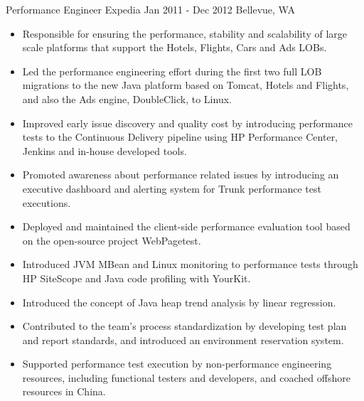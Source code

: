 \documentclass[]{mspier-cv}
\begin{document}
\experienceitem
  {Performance Engineer}
  {Expedia}
  {Jan 2011 - Dec 2012}
  {Bellevue, WA}
  {
  \begin{itemize}
    \item Responsible for ensuring the performance, stability and scalability of large scale platforms that support the Hotels, Flights, Cars and Ads LOBs.
    \item Led the performance engineering effort during the first two full LOB migrations to the new Java platform based on Tomcat, Hotels and Flights, and also the Ads engine, DoubleClick, to Linux.
    \item Improved early issue discovery and quality cost by introducing performance tests to the Continuous Delivery pipeline using HP Performance Center, Jenkins and in-house developed tools.
    \item Promoted awareness about performance related issues by introducing an executive dashboard and alerting system for Trunk performance test executions.
    \item Deployed and maintained the client-side performance evaluation tool based on the open-source project WebPagetest.
    \item Introduced JVM MBean and Linux monitoring to performance tests through HP SiteScope and Java code profiling with YourKit.
    \item Introduced the concept of Java heap trend analysis by linear regression.
    \item Contributed to the team’s process standardization by developing test plan and report standards, and introduced an environment reservation system.
    \item Supported performance test execution by non-performance engineering resources, including functional testers and developers, and coached offshore resources in China.
  \end{itemize}
  }
\end{document}
